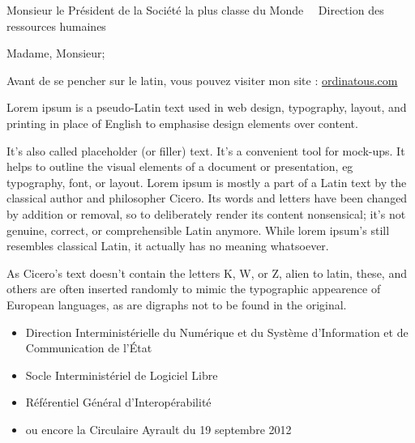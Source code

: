 \documentclass{scrlttr2}
\renewcommand{\\}{~{\large\textperiodcentered}~}%
\def\ordinatous.com{\href{https://ordinatous.com}{ordinatous.com}\xspace}
\begin{document}

\begin{letter}{ %
Monsieur le Président de
la Société la plus classe du Monde\\
Direction des ressources humaines\\

}


\opening {Madame, Monsieur;}

Avant de se pencher sur le latin, vous pouvez visiter mon site : \ordinatous.com \\

Lorem ipsum is a pseudo-Latin text used in web design, typography, layout, and printing in place of English to emphasise design elements over content. \\

It's also called placeholder (or filler) text. It's a convenient tool for mock-ups. It helps to outline the visual elements of a document or presentation, eg typography, font, or layout. Lorem ipsum is mostly a part of a Latin text by the classical author and philosopher Cicero. Its words and letters have been changed by addition or removal, so to deliberately render its content nonsensical; it's not genuine, correct, or comprehensible Latin anymore. While lorem ipsum's still resembles classical Latin, it actually has no meaning whatsoever. \\

As Cicero's text doesn't contain the letters K, W, or Z, alien to latin, these, and others are often inserted randomly to mimic the typographic appearence of European languages, as are digraphs not to be found in the original.\\

\begin{itemize}
	\item Direction Interministérielle du Numérique et du Système d'Information et de Communication de l'État
	\item Socle Interministériel de Logiciel Libre
	\item Référentiel Général d'Interopérabilité
	\item ou encore la Circulaire Ayrault du 19 septembre 2012
\end{itemize}



\end{letter}
\end{document}
